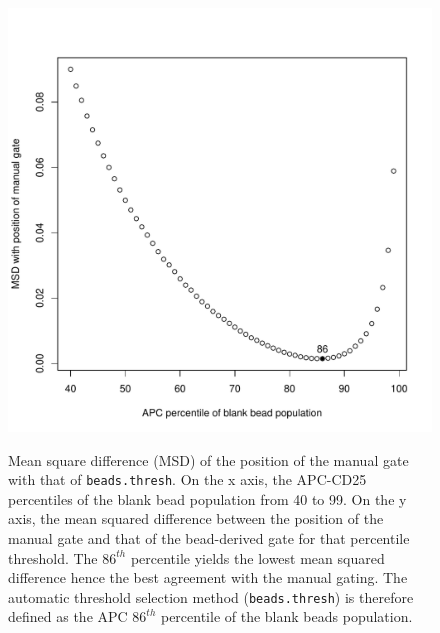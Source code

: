 \begin{figure}
\centering
\begin{minipage}{.6\textwidth}
\includegraphics[width=\linewidth]{figures/cd25pos-gate-agreement.pdf}
\end{minipage}
{ Mean square difference (MSD) of the position of the manual gate with that of \texttt{beads.thresh}. }
{
On the x axis, the APC-CD25 percentiles of the blank bead population from 40 to 99.
On the y axis, the mean squared difference between the position of the manual gate and that of the bead-derived gate for that percentile threshold.
The $86^{th}$ percentile yields the lowest mean squared difference hence the best agreement with the manual gating.
The automatic threshold selection method (\texttt{beads.thresh}) is therefore defined as the APC $86^{th}$ percentile of the blank beads population.
}
\begin{minipage}{.6\textwidth}

\end{minipage}
\end{figure}

